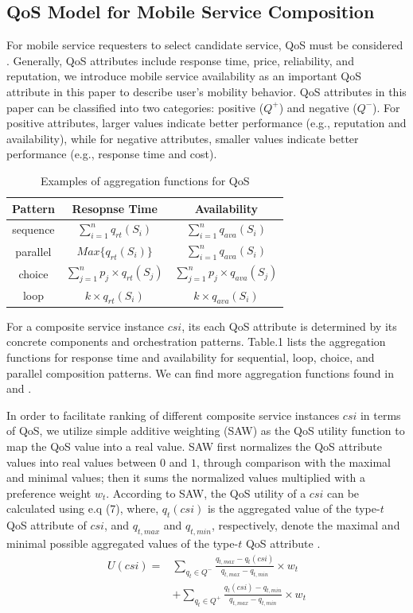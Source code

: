 \documentclass[10pt,journal,compsoc]{IEEEtran}
\begin{document}
\subsection{QoS Model for Mobile Service Composition}
For mobile service requesters to select candidate service, QoS must be considered \cite{Wu2016,luo2014efficient,luo2016generating}. Generally, QoS attributes include response time, price, reliability, and reputation, we introduce mobile service availability as an important QoS attribute in this paper to describe user's mobility behavior. QoS attributes in this paper can be classified into two categories: positive ($Q^+$) and negative ($Q^{-}$). For positive attributes, larger values indicate better performance (e.g., reputation and availability), while for negative attributes, smaller values indicate better performance (e.g., response time and cost).

\begin{table}[!t]
\renewcommand{\arraystretch}{1.3}
\caption{Examples of aggregation functions for QoS}
\label{table_example}
\centering
\begin{tabular}{ccc}
\hline
\bfseries Pattern & \bfseries Resopnse Time & \bfseries Availability \\
\hline
sequence & $\sum_{i=1}^{n}q_{rt}(S_i)$ & $\sum_{i=1}^{n}q_{ava}(S_i)$ \\
parallel & $Max\{q_{rt}(S_i)\}$ & $\sum_{i=1}^{n}q_{ava}(S_i)$ \\
choice & $\sum_{j=1}^{n} p_j \times q_{rt}(S_j)$ & $\sum_{j=1}^{n} p_j \times q_{ava}(S_j)$ \\
loop & $k \times q_{rt}(S_i)$ & $k \times q_{ava}(S_i)$ \\
\hline
\end{tabular}
\end{table}

For a composite service instance $csi$, its each QoS attribute is determined by its concrete components and orchestration patterns. Table.1 lists the aggregation functions for response time and availability for sequential, loop, choice, and parallel composition patterns. We can find more aggregation functions found in \cite{jaeger2004qos} and \cite{zheng2013qos}.

In order to facilitate ranking of different composite service instances $csi$ in terms of QoS, we utilize simple additive weighting (SAW) as the QoS utility function to map the QoS value into a real value. SAW first normalizes the QoS attribute values into real values between $0$ and $1$, through comparison with the maximal and minimal values; then it sums the normalized values multiplied with a preference weight $w_t$. According to SAW, the QoS utility of a $csi$ can be calculated using e.q (7), where, $q_t(csi)$ is the aggregated value of the type-$t$ QoS attribute of $csi$, and $q_{t,max}$ and $q_{t,min}$, respectively, denote the maximal and minimal possible aggregated values of the type-$t$ QoS attribute \cite{Wu2016}.
\begin{align}
U(csi) = & \sum_{q_t \in Q^-} \frac{q_{t,max}-q_t(csi)}{q_{t,max}-q_{t,min}}\times w_t \\\nonumber
& +\sum_{q_t \in Q^+} \frac{q_t(csi)-q_{t,min}}{q_{t,max}-q_{t,min}}\times w_t
\end{align}
\end{document}
